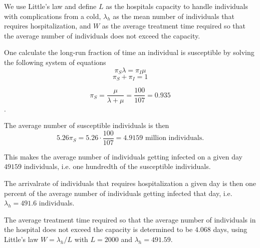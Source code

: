We use Little's law and define $L$ as the hospitals capacity to handle individuals with complications from a cold, $\lambda_h$ as the mean number of individuals that requires hospitalization, and $W$ as the average treatment time required so that the average number of individuals does not exceed the capacity. 

One calculate the long-run fraction of time an individual is susceptible by solving the following system of equations
$$ \pi_S \lambda = \pi_I \mu$$ 
$$ \pi_S + \pi_I = 1 $$

$$ \pi_S = \frac{\mu}{\lambda + \mu} = \frac{100}{107} = 0.935$$.

The average number of susceptible individuals is then 
$$ 5.26  \pi_S = 5.26 \cdot \frac{100}{107} = 4.9159 \text{ million individuals.}$$

This makes the average number of individuals getting infected on a given day $ 49159$ individuals, i.e. one hundredth of the susceptible individuals.

The arrivalrate of individuals that requires hospitalization a given day is then one percent of the average number of individuals getting infected that day, i.e. $\lambda_h = 491.6$ individuals. 

The average treatment time required so that the average number of individuals in the hospital does not exceed the capacity is determined to be $4.068$ days, using Little's law $W = \lambda_h/L$ with $L = 2000$ and $\lambda_h = 491.59$. 



